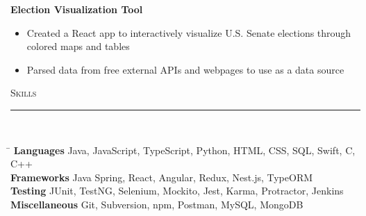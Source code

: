 \documentclass[11pt]{article}
\begin{document}
\begin{raggedright}
	\textbf{\large Election Visualization Tool} 
	\begin{itemize}
		\item Created a React app to interactively visualize U.S. Senate elections through colored maps and tables
		\item Parsed data from free external APIs and webpages to use as a data source
	\end{itemize}
	\vspace{0.15in}
	
	
	\textsc{\Large Skills} \\
	\vspace{-0.1in}
	\rule{\textwidth}{0.4pt} \\
	\vspace{0.05in}

	\begin{tabbing}
		\hspace*{4cm}\= \kill
		\textbf{Languages}  \> Java, JavaScript, TypeScript, Python, HTML, CSS, SQL, Swift, C, C++ \\
		\textbf{Frameworks} \> Java Spring, React, Angular, Redux, Nest.js, TypeORM \\
		\textbf{Testing} \> JUnit, TestNG, Selenium, Mockito, Jest, Karma, Protractor, Jenkins \\
		\textbf{Miscellaneous} \> Git, Subversion, npm, Postman, MySQL, MongoDB \\
	\end{tabbing}
		
\end{raggedright}	
\end{document}
